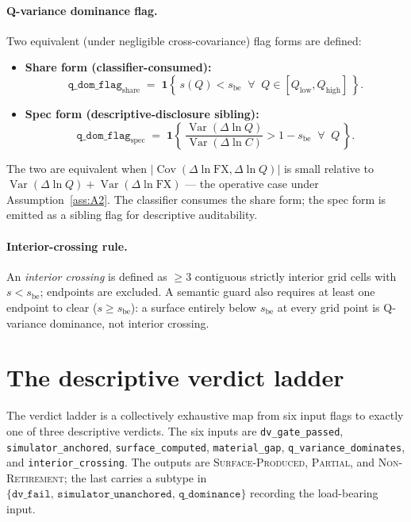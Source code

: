 \documentclass[11pt,letterpaper]{article}
\newcommand{\Var}{\operatorname{Var}}
\newcommand{\Cov}{\operatorname{Cov}}
\newcommand{\dln}{\Delta\ln}
\newcommand{\sbe}{s_{\mathrm{be}}}
\newcommand{\Cfx}{\mathrm{FX}}
\theoremstyle{assumption}
\begin{document}
\paragraph{Q-variance dominance flag.}
Two equivalent (under negligible cross-covariance) flag forms are defined:
\begin{itemize}
\item \textbf{Share form (classifier-consumed):}
  \begin{equation*}
    \texttt{q\_dom\_flag}_{\mathrm{share}} \;=\;
    \mathbf{1}\!\left\{\, s(Q) < \sbe
    \;\;\forall\;\; Q \in [Q_{\mathrm{low}}, Q_{\mathrm{high}}]\,\right\}.
  \end{equation*}
\item \textbf{Spec form (descriptive-disclosure sibling):}
  \begin{equation*}
    \texttt{q\_dom\_flag}_{\mathrm{spec}} \;=\;
    \mathbf{1}\!\left\{\, \frac{\Var(\dln Q)}{\Var(\dln C)} > 1 - \sbe
    \;\;\forall\;\; Q \,\right\}.
  \end{equation*}
\end{itemize}
The two are equivalent when $|\Cov(\dln \Cfx, \dln Q)|$ is small relative to
$\Var(\dln Q) + \Var(\dln \Cfx)$ --- the operative case under
Assumption~\ref{ass:A2}. The classifier consumes the share form; the spec
form is emitted as a sibling flag for descriptive auditability.

\paragraph{Interior-crossing rule.}
An \emph{interior crossing} is defined as $\geq 3$ contiguous strictly
interior grid cells with $s < \sbe$; endpoints are excluded. A semantic guard
also requires at least one endpoint to clear ($s \geq \sbe$): a surface
entirely below $\sbe$ at every grid point is Q-variance dominance, not
interior crossing.

\section{The descriptive verdict ladder}
\label{sec:e10-ladder}

The verdict ladder is a collectively exhaustive map from six input flags to
exactly one of three descriptive verdicts. The six inputs are
\texttt{dv\_gate\_passed}, \texttt{simulator\_anchored},
\texttt{surface\_computed}, \texttt{material\_gap},
\texttt{q\_variance\_dominates}, and \texttt{interior\_crossing}. The
outputs are \textsc{Surface-Produced}, \textsc{Partial}, and
\textsc{Non-Retirement}; the last carries a subtype in
$\{\texttt{dv\_fail},\,\texttt{simulator\_unanchored},\,
\texttt{q\_dominance}\}$ recording the load-bearing input.
\end{document}
